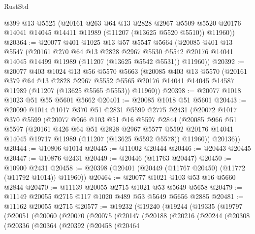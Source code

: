 \begin{lexlean}{RustStd}
\begin{coremodule}
      @399
      @13
      @5525
      (@20161
        @263
        @64
        @13
        @2828
        @2967
        @5509
        @5520
        @20176
        @14041
        @14045
        @14411
        @11989
        (@11207 (@13625 @5520 @5510))
        @11960))
@20364 := @20077
    @401
    @1025
    @13
    @57
    @5547
    @5664
    (@20085
      @401
      @13
      @5547
      (@20161
        @270
        @64
        @13
        @2828
        @2967
        @5530
        @5542
        @20176
        @14041
        @14045
        @14499
        @11989
        (@11207 (@13625 @5542 @5531))
        @11960))
@20392 := @20077
    @403
    @1024
    @13
    @56
    @5570
    @5663
    (@20085
      @403
      @13
      @5570
      (@20161
        @379
        @64
        @13
        @2828
        @2967
        @5552
        @5565
        @20176
        @14041
        @14045
        @14587
        @11989
        (@11207 (@13625 @5565 @5553))
        @11960))
@20398 := @20077 @1018 @1023 @51 @55 @5601 @5662
@20401 := @20085 @1018 @51 @5601
@20443 := @20090
    @1014
    @1017
    @370
    @51
    @2831
    @5599
    @2775
    @2431
    (@20072
      @1017
      @370
      @5599
      (@20077
        @966
        @103
        @51
        @16
        @5597
        @2844
        (@20085
          @966
          @51
          @5597
          (@20161
            @426
            @64
            @51
            @2828
            @2967
            @5577
            @5592
            @20176
            @14041
            @14045
            @19717
            @11989
            (@11207 (@13625 @5592 @5578))
            @11960))
        @20136))
@20444 := @10806 @1014
@20445 := @11002 @20444
@20446 := @20443 @20445
@20447 := @10876 @2431
@20449 := @20446 (@11763 @20447)
@20450 := @10900 @2431
@20458 := @20398 (@20401 (@20449 (@11767 @20450) (@11772 (@11792 @1014)) @11960))
@20464 := @20077 @1021 @103 @53 @16 @5660 @2844
@20470 := @11139 @20055 @2715 @1021 @53 @5649 @5658
@20479 := @11149 @20055 @2715 @117 @1020 @489 @53 @5649 @5656 @2885
@20481 := @11162 @20055 @2715
@20577 := @19232
    (@19240
      (@19244
        (@19335
          (@19797
            (@20051
              (@20060
                (@20070
                  (@20075
                    (@20147
                      (@20188
                        (@20216
                          (@20244
                            (@20308
                              (@20336
                                (@20364
                                  (@20392
                                    (@20458
                                      (@20464

\end{coremodule}
\end{lexlean}
